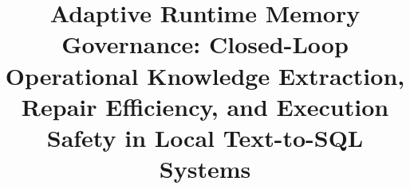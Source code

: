 \long{}
\makeatother



\title{Adaptive Runtime Memory Governance: Closed-Loop Operational Knowledge Extraction, Repair Efficiency, and Execution Safety in Local Text-to-SQL Systems}

